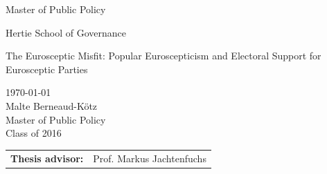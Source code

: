 


	\pagestyle{empty}
	

	
	\begin{center}
		\begin{Huge}
			Master of Public Policy\\
			\vspace{3mm}
		\end{Huge}{\Large Hertie School of Governance}\\
		
		\vspace{20mm}
		\begin{Huge}
			The Eurosceptic Misfit: Popular Euroscepticism and Electoral Support for Eurosceptic Parties\\
		\end{Huge}
		\vspace{20mm}
		
		\vspace{1cm}
		\today \\
		\vspace{1 cm}
		Malte Berneaud-Kötz \\
		Master of Public Policy\\
		Class of 2016\\
		\vspace{6cm}
		\begin{tabular}{ll}
			{\bf Thesis advisor:} & Prof. Markus Jachtenfuchs\\
		\end{tabular}
		
	\end{center}

\pagebreak

\cleardoublepage
{}
\tableofcontents
\cleardoublepage

\pagebreak
\pagestyle{plain}

